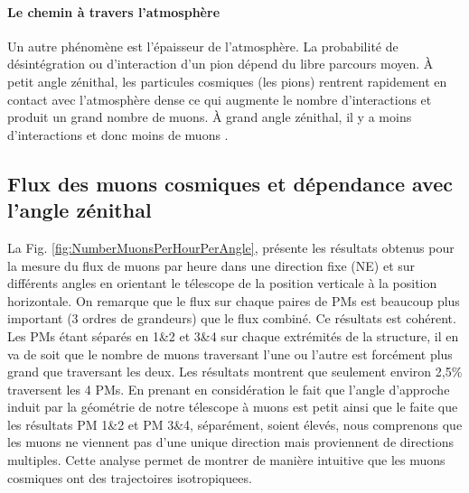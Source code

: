 \documentclass[12pt]{article}
\begin{document}
\paragraph{Le chemin à travers l'atmosphère}
Un autre phénomène est l'épaisseur de l'atmosphère. La probabilité de désintégration ou d'interaction d'un pion dépend du libre parcours moyen. À petit angle zénithal, les particules cosmiques (les pions) rentrent rapidement en contact avec l'atmosphère dense ce qui augmente le nombre d'interactions et produit un grand nombre de muons. À grand angle zénithal, il y a moins d'interactions et donc moins de muons \cite{schwerdt_measurement_2018}.


\subsection{Flux des muons cosmiques et dépendance avec l'angle zénithal}

La Fig. \ref{fig:NumberMuonsPerHourPerAngle}, présente les résultats obtenus pour la mesure du flux de muons par heure dans une direction fixe (NE) et sur différents angles en orientant le télescope de la position verticale à la position horizontale. On remarque que le flux sur chaque paires de PMs est beaucoup plus important (3 ordres de grandeurs) que le flux combiné.
Ce résultats est cohérent. Les PMs étant séparés en 1\&2 et 3\&4 sur chaque extrémités de la structure, il en va de soit que le nombre de muons traversant l'une ou l'autre est forcément plus grand que traversant les deux. Les résultats montrent que seulement environ 2,5\% traversent les 4 PMs. En prenant en considération le fait que l'angle d'approche induit par la géométrie de notre télescope à muons est petit ainsi que le faite que les résultats PM 1\&2 et PM 3\&4, séparément, soient élevés, nous comprenons que les muons ne viennent pas d'une unique direction mais proviennent de directions multiples. Cette analyse permet de montrer de manière intuitive que les muons cosmiques ont des trajectoires isotropiquees.
\end{document}

